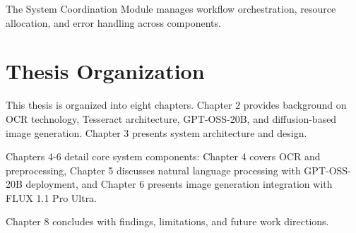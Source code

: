 The System Coordination Module manages workflow orchestration, resource allocation, and error handling across components.

\section{Thesis Organization}

This thesis is organized into eight chapters. Chapter 2 provides background on OCR technology, Tesseract architecture, GPT-OSS-20B, and diffusion-based image generation. Chapter 3 presents system architecture and design. 

Chapters 4-6 detail core system components: Chapter 4 covers OCR and preprocessing, Chapter 5 discusses natural language processing with GPT-OSS-20B deployment, and Chapter 6 presents image generation integration with FLUX 1.1 Pro Ultra.

Chapter 8 concludes with findings, limitations, and future work directions.



